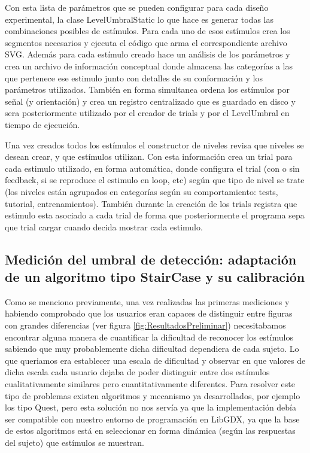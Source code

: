 \documentclass{article}
\begin{document}
    Con esta lista de parámetros que se pueden configurar para cada diseño experimental, la clase LevelUmbralStatic lo que hace es generar todas las combinaciones posibles de estímulos. Para cada uno de esos estímulos crea los segmentos necesarios y ejecuta el código que arma el correspondiente archivo SVG. Además para cada estímulo creado hace un análisis de los parámetros y crea un archivo de información conceptual donde almacena las categorías a las que pertenece ese estimulo junto con detalles de su conformación y los parámetros utilizados. También en forma simultanea ordena los estímulos por señal (y orientación) y crea un registro centralizado que es guardado en disco y sera posteriormente utilizado por el creador de trials y por el LevelUmbral en tiempo de ejecución.
    
    Una vez creados todos los estímulos el constructor de niveles revisa que niveles se desean crear, y que estímulos utilizan. Con esta información crea un trial para cada estimulo utilizado, en forma automática, donde configura el trial (con o sin feedback, si se reproduce el estimulo en loop, etc) según que tipo de nivel se trate (los niveles están agrupados en categorías según su comportamiento: tests, tutorial, entrenamientos). También durante la creación de los trials registra que estimulo esta asociado a cada trial de forma que posteriormente el programa sepa que trial cargar cuando decida mostrar cada estimulo. 
    
    \subsection{Medición del umbral de detección: adaptación de un algoritmo tipo StairCase y su calibración}
    \label{seccion:staircase}
    
    Como se menciono previamente, una vez realizadas las primeras mediciones y habiendo comprobado que los usuarios eran capaces de distinguir entre figuras con grandes diferencias (ver figura \ref{fig:ResultadosPreliminar}) necesitabamos encontrar alguna manera de cuantificar la dificultad de reconocer los estímulos sabiendo que muy probablemente dicha dificultad dependiera de cada sujeto. Lo que queriamos era establecer una escala de dificultad y observar en que valores de dicha escala cada usuario dejaba de poder distinguir entre dos estímulos cualitativamente similares pero cuantitativamente diferentes. Para resolver este tipo de problemas existen algoritmos y mecanismo ya desarrollados, por ejemplo los tipo Quest, pero esta solución no nos servía ya que la implementación debía ser compatible con nuestro entorno de programación en LibGDX, ya que la base de estos algoritmos está en seleccionar en forma dinámica (según las respuestas del sujeto) que estímulos se muestran. 
    
\end{document}

